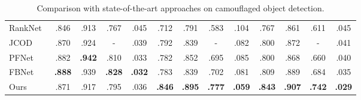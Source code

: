 \begin{table*}[t]
\begin{minipage}{1.0\linewidth}
\begin{tabular}{l||cccc|cccc|cccc}
            RankNet~\cite{lv2021simultaneously}  & .846 & .913 & .767 & .045 & .712 & .791 & .583 & .104 & .767 & .861 & .611 & .045 \\
            JCOD~\cite{li2021uncertainty}  & .870 & .924 & - & .039 & .792 & .839 & - & .082 & .800 & .872 & - & .041 \\
            PFNet~\cite{mei2021camouflaged} & .882 & \textbf{.942} & .810 & .033 & .782 & .852 & .695 & .085 & .800 & .868 & .660 & .040  \\
            FBNet~\cite{jiaying2022frequency} & \textbf{.888} & .939 & \textbf{.828} & \textbf{.032} & .783 & .839 & .702 & .081 & .809 & .889 & .684 & .035 \\
            \hline
            Ours & .871 & .917 & .795 & .036 & \textbf{.846} & \textbf{.895} & \textbf{.777} & \textbf{.059} & \textbf{.843} & \textbf{.907} & \textbf{.742} & \textbf{.029} \\
            \bottomrule
        \end{tabular}
\caption{Comparison with state-of-the-art approaches on camouflaged object detection.}
    \label{tab:sota_cod}
	\end{minipage}\quad
\end{table*}




